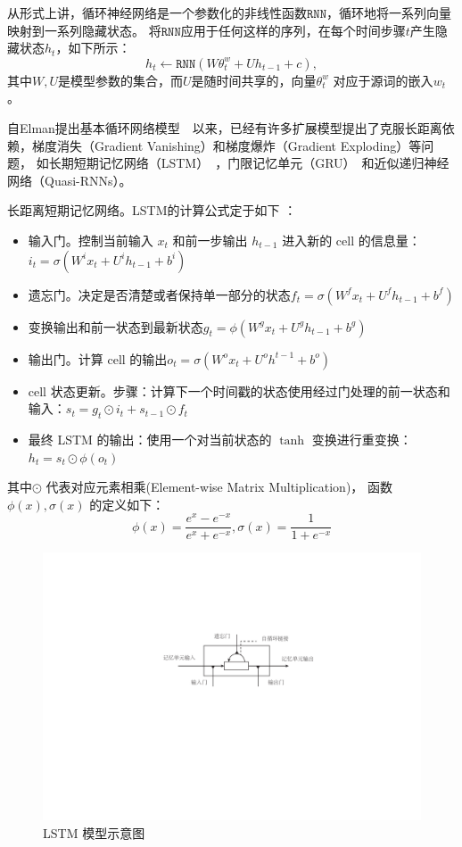 从形式上讲，循环神经网络是一个参数化的非线性函数$ \mathtt{RNN} $，循环地将一系列向量映射到一系列隐藏状态。 将$ \mathtt{RNN} $应用于任何这样的序列，在每个时间步骤$ t $产生隐藏状态$ h_t $，如下所示：
\begin{equation}
  h_t \leftarrow  \mathtt{RNN}(W\theta^w_t + U h_{t-1} +c),
\end{equation}
其中$ W,U $是模型参数的集合，而$ U $是随时间共享的，向量$ \theta^w_t$ 对应于源词的嵌入$ w_t $。

自Elman提出基本循环网络模型~~以来，已经有许多扩展模型提出了克服长距离依赖，梯度消失（Gradient Vanishing）和梯度爆炸（Gradient Exploding）等问题， 如长期短期记忆网络（LSTM）~，门限记忆单元（GRU）~和近似递归神经网络（Quasi-RNNs）。



{长距离短期记忆网络}。LSTM的计算公式定于如下 ：
\begin{itemize}
\item 输入门。控制当前输入 $x_t$ 和前一步输出 $h_{t−1}$ 进入新的 cell 的信息量：$i_t=\sigma(W^i x_t+U^i h_{t-1}+b^i)$
\item  遗忘门。决定是否清楚或者保持单一部分的状态$f_t=\sigma(W^f x_t+U^f h_{t-1}+b^f)$
\item  变换输出和前一状态到最新状态$g_t=\phi(W^g x_t+U^g h_{t-1}+b^g)$
\item  输出门。计算 cell 的输出$o_t=\sigma(W^o x_t+U^o h^{t-1}+b^o)$
\item  cell 状态更新。步骤：计算下一个时间戳的状态使用经过门处理的前一状态和输入：$s_t=g_t\odot i_t+s_{t-1}\odot f_t$
\item 最终 LSTM 的输出：使用一个对当前状态的 $\tanh$ 变换进行重变换：$h_t=s_t\odot \phi(o_t)$
\end{itemize}
\noindent 其中$\odot$ 代表对应元素相乘(Element-wise Matrix Multiplication)， 函数 $\phi(x), \sigma(x)$ 的定义如下：
\begin{equation}\label{equ:tanh}
  \phi(x)=\frac{e^x-e^{-x}}{e^x+e^{-x}},\sigma(x)=\frac{1}{1+e^{-x}}
\end{equation}

\begin{figure}
  \centering
  \includegraphics[width=0.7\linewidth]{./figures/lstm.pdf}
  \caption{LSTM 模型示意图}\label{fig:lstm}
\end{figure}

